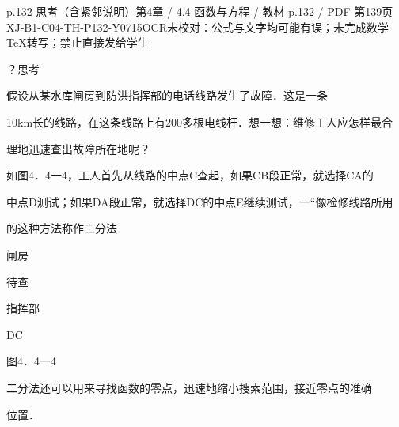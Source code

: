 \begin{bankitem}{p.132 思考（含紧邻说明）}{第4章 / 4.4 函数与方程 / 教材 p.132 / PDF 第139页}{XJ-B1-C04-TH-P132-Y0715}{OCR未校对：公式与文字均可能有误；未完成数学TeX转写；禁止直接发给学生}
\begin{ocrdraft}
\par
？思考
\par
假设从某水库闸房到防洪指挥部的电话线路发生了故障．这是一条
\par
10km长的线路，在这条线路上有200多根电线杆．想一想：维修工人应怎样最合
\par
理地迅速查出故障所在地呢？
\par
如图4．4一4，工人首先从线路的中点C查起，如果CB段正常，就选择CA的
\par
中点D测试；如果DA段正常，就选择DC的中点E继续测试，一“像检修线路所用
\par
的这种方法称作二分法
\par
闸房
\par
待查
\par
指挥部
\par
DC
\par
图4．4一4
\par
二分法还可以用来寻找函数的零点，迅速地缩小搜索范围，接近零点的准确
\par
位置．
\end{ocrdraft}
\end{bankitem}
